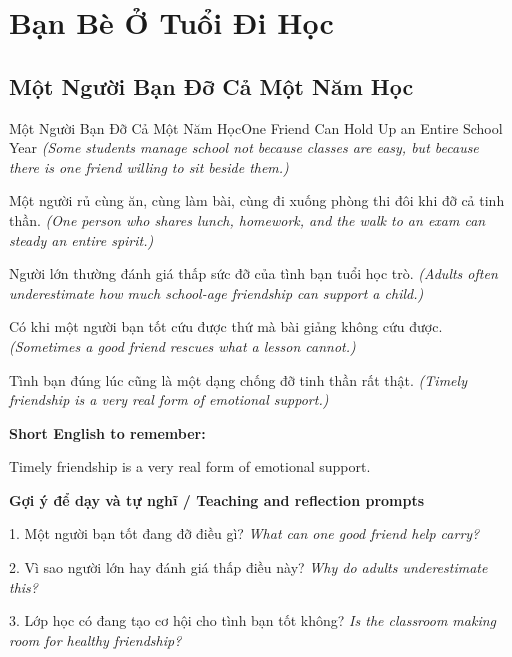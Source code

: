 \chapter{Bạn Bè Ở Tuổi Đi Học}

\section{Một Người Bạn Đỡ Cả Một Năm Học}
\begin{truyen}{Một Người Bạn Đỡ Cả Một Năm Học}{One Friend Can Hold Up an Entire School Year}
\textit{(Some students manage school not because classes are easy, but because there is one friend willing to sit beside them.)}

Một người rủ cùng ăn, cùng làm bài, cùng đi xuống phòng thi đôi khi đỡ cả tinh thần.
\textit{(One person who shares lunch, homework, and the walk to an exam can steady an entire spirit.)}

Người lớn thường đánh giá thấp sức đỡ của tình bạn tuổi học trò.
\textit{(Adults often underestimate how much school-age friendship can support a child.)}

Có khi một người bạn tốt cứu được thứ mà bài giảng không cứu được.
\textit{(Sometimes a good friend rescues what a lesson cannot.)}

\end{truyen}

\begin{baihoc}
Tình bạn đúng lúc cũng là một dạng chống đỡ tinh thần rất thật.
\textit{(Timely friendship is a very real form of emotional support.)}
\end{baihoc}

\begin{ghinhoanh}
\textbf{Short English to remember:}

Timely friendship is a very real form of emotional support.

\end{ghinhoanh}

\begin{tuhocnhanh}
\textbf{Gợi ý để dạy và tự nghĩ / Teaching and reflection prompts}

1. Một người bạn tốt đang đỡ điều gì? \textit{What can one good friend help carry?}

2. Vì sao người lớn hay đánh giá thấp điều này? \textit{Why do adults underestimate this?}

3. Lớp học có đang tạo cơ hội cho tình bạn tốt không? \textit{Is the classroom making room for healthy friendship?}
\end{tuhocnhanh}
\ngancach

